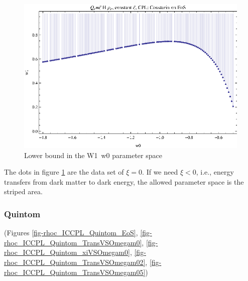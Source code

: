\documentclass[12pt,a4paper]{article}
\begin{document}
\begin{figure}[!htpb]
\centering
\includegraphics[width=500pt]{ICCPL_w1VSw0_LowerBound.eps}
\caption{Lower bound in the W1~w0 parameter space}\label{ICCPL_w1VSw0_LowerBound}
\end{figure}

The dots in figure \ref{ICCPL_w1VSw0_LowerBound} are the data set of $\xi=0$. If we need $\xi<0$, i.e., energy transfers from dark matter to dark energy, the allowed parameter space is the striped area.




\subsubsection{Quintom}

(Figures \ref{fig-rhoc_ICCPL_Quintom_EoS}, \ref{fig-rhoc_ICCPL_Quintom_TransVSOmegam0}, \ref{fig-rhoc_ICCPL_Quintom_xiVSOmegam0}, \ref{fig-rhoc_ICCPL_Quintom_TransVSOmegam02}, \ref{fig-rhoc_ICCPL_Quintom_TransVSOmegam05})
\end{document}
